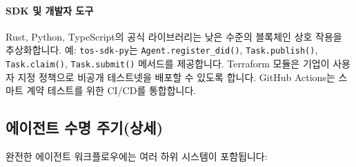 \documentclass[11pt]{article}
\begin{document}
\paragraph{SDK 및 개발자 도구} Rust, Python, TypeScript의 공식 라이브러리는 낮은 수준의 블록체인 상호 작용을 추상화합니다. 예: \texttt{tos-sdk-py}는 \texttt{Agent.register\_did()}, \texttt{Task.publish()}, \texttt{Task.claim()}, \texttt{Task.submit()} 메서드를 제공합니다. Terraform 모듈은 기업이 사용자 지정 정책으로 비공개 테스트넷을 배포할 수 있도록 합니다. GitHub Actions는 스마트 계약 테스트를 위한 CI/CD를 통합합니다.

\subsection{에이전트 수명 주기(상세)}
완전한 에이전트 워크플로우에는 여러 하위 시스템이 포함됩니다:
\end{document}
